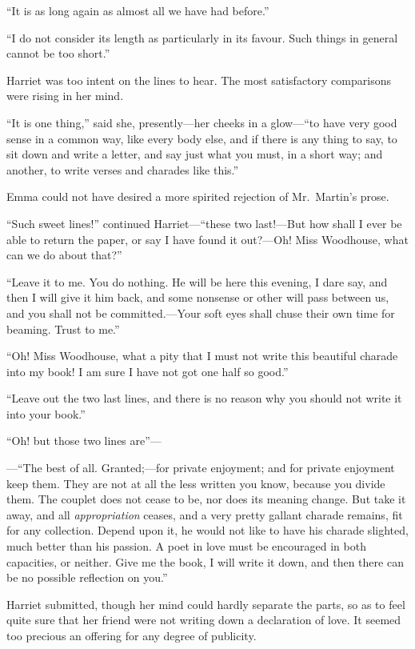 ``It is as long again as almost all we have had before.''

``I do not consider its length as particularly in its favour.
Such things in general cannot be too short.''

Harriet was too intent on the lines to hear.  The most satisfactory
comparisons were rising in her mind.

``It is one thing,'' said she, presently---her cheeks in a glow---``to
have very good sense in a common way, like every body else,
and if there is any thing to say, to sit down and write a letter,
and say just what you must, in a short way; and another, to write
verses and charades like this.''

Emma could not have desired a more spirited rejection of Mr.\ Martin's prose.

``Such sweet lines!'' continued Harriet---``these two last!---But
how shall I ever be able to return the paper, or say I have found
it out?---Oh! Miss Woodhouse, what can we do about that?''

``Leave it to me.  You do nothing.  He will be here this evening,
I dare say, and then I will give it him back, and some nonsense
or other will pass between us, and you shall not be committed.---Your
soft eyes shall chuse their own time for beaming.  Trust to me.''

``Oh! Miss Woodhouse, what a pity that I must not write this beautiful
charade into my book! I am sure I have not got one half so good.''

``Leave out the two last lines, and there is no reason why you
should not write it into your book.''

``Oh! but those two lines are''---%

---``The best of all.  Granted;---for private enjoyment; and for private
enjoyment keep them.  They are not at all the less written you know,
because you divide them.  The couplet does not cease to be, nor does
its meaning change.  But take it away, and all \emph{appropriation} ceases,
and a very pretty gallant charade remains, fit for any collection.
Depend upon it, he would not like to have his charade slighted,
much better than his passion.  A poet in love must be encouraged in
both capacities, or neither.  Give me the book, I will write it down,
and then there can be no possible reflection on you.''

Harriet submitted, though her mind could hardly separate the parts,
so as to feel quite sure that her friend were not writing down
a declaration of love.  It seemed too precious an offering for any
degree of publicity.

